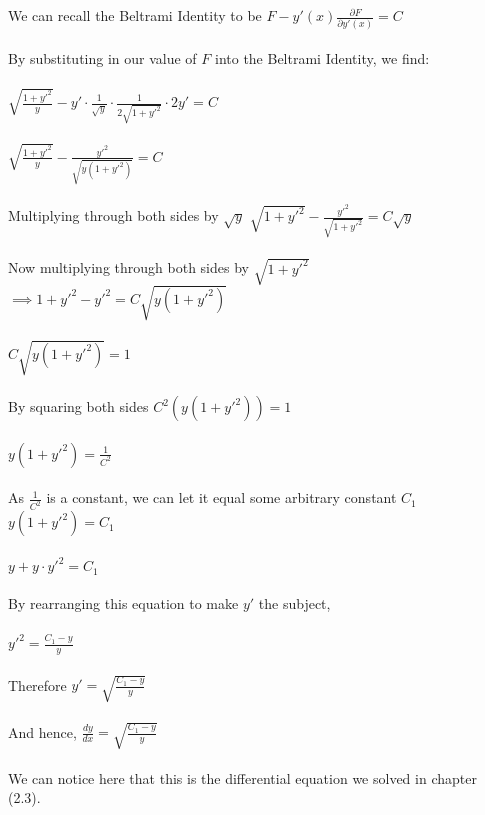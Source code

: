 \documentclass[12pt]{report}
\begin{document}
\\
\\
We can recall the Beltrami Identity to be \(F - y'(x)\frac{\partial F}{\partial y'(x)} = C\)
\\
\\
By substituting in our value of \(F\) into the Beltrami Identity, we find:
\\
\\
\(\sqrt{\frac{{1+y'^2}}{y}} - y' \cdot \frac{1}{\sqrt{y}} \cdot \frac{1}{2\sqrt{1+y'^2}} \cdot 2y' = C\)
\\
\\
\implies \(\sqrt{\frac{{1+y'^2}}{y}} - \frac{y'^2}{\sqrt{y(1+y'^2)}} = C\)
\\
\\
Multiplying through both sides by \(\sqrt{y}\) \implies \(\sqrt{1+y'^2} - \frac{y'^2}{\sqrt{1+y'^2}} = C\sqrt{y}\)
\\
\\
Now multiplying through both sides by \(\sqrt{1+y'^2}\)
\\
\(\implies 1 + y'^2 - y'^2 = C\sqrt{y(1+y'^2)}\)
\\
\\
\implies \(C\sqrt{y(1+y'^2)} = 1\)
\\
\\
By squaring both sides \implies \(C^2(y(1+y'^2)) = 1\)
\\
\\
\implies \(y(1+y'^2) = \frac{1}{C^2}\)
\\
\\
As \(\frac{1}{C^2}\) is a constant, we can let it equal some arbitrary constant \(C_{1}\)
\\
\implies \(y(1+y'^2) = C_{1}\)
\\
\\
\(y+y \cdot y'^2 = C_{1}\)
\\
\\
By rearranging this equation to make \(y'\) the subject,
\\
\\
\(y'^2 = \frac{C_{1}-y}{y}\)
\\
\\
Therefore \(y' = \sqrt{\frac{C_{1}-y}{y}}\)
\\
\\
And hence, \(\frac{dy}{dx} = \sqrt{\frac{C_{1}-y}{y}}\)
\\
\\
We can notice here that this is the differential equation we solved in chapter (2.3).
\\
\end{document}
